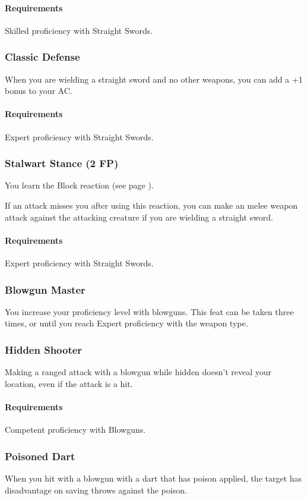     \paragraph{Requirements} Skilled proficiency with Straight Swords.
\subsubsection{Classic Defense} \label{feat::classicdefense}
    When you are wielding a straight sword and no other weapons, you can add a +1 bonus to your AC.
    \paragraph{Requirements} Expert proficiency with Straight Swords.
\subsubsection{Stalwart Stance (2 FP)} \label{feat::stalwartstance}
    You learn the Block reaction (see page \pageref{act::block}).

    If an attack misses you after using this reaction, you can make an melee weapon attack against the attacking creature if you are wielding a straight sword.
    \paragraph{Requirements} Expert proficiency with Straight Swords.

\subsubsection{Blowgun Master} \label{feat::blowgunmaster}
    You increase your proficiency level with blowguns.
    This feat can be taken three times, or until you reach Expert proficiency with the weapon type.
\subsubsection{Hidden Shooter} \label{feat::hiddenshooter}
    Making a ranged attack with a blowgun while hidden doesn't reveal your location, even if the attack is a hit.
    \paragraph{Requirements} Competent proficiency with Blowguns.
\subsubsection{Poisoned Dart} \label{feat::poisoneddart}
    When you hit with a blowgun with a dart that has poison applied, the target has disadvantage on saving throws against the poison.
